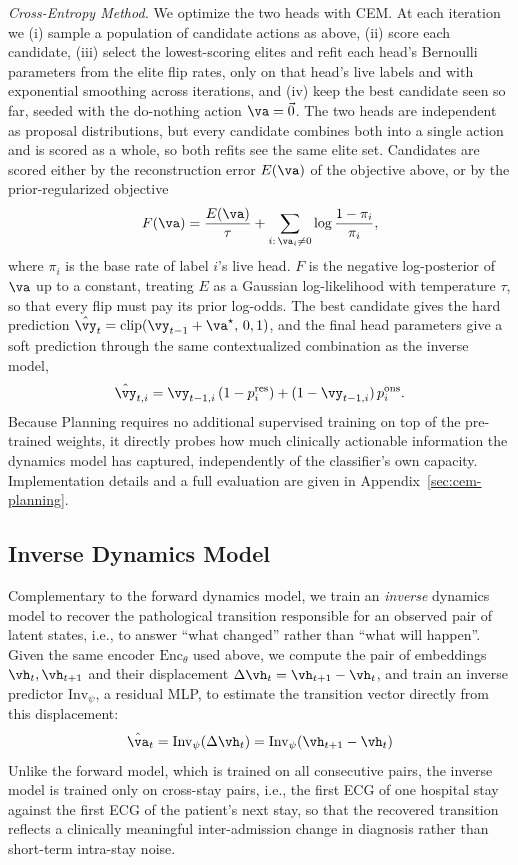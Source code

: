 \emph{Cross-Entropy Method.} We optimize the two heads with CEM. At each iteration we (i) sample a population of candidate actions as above, (ii) score each candidate, (iii) select the lowest-scoring elites and refit each head's Bernoulli parameters from the elite flip rates, only on that head's live labels and with exponential smoothing across iterations, and (iv) keep the best candidate seen so far, seeded with the do-nothing action $\va=\vec 0$. The two heads are independent as proposal distributions, but every candidate combines both into a single action and is scored as a whole, so both refits see the same elite set. Candidates are scored either by the reconstruction error $E(\va)$ of the objective above, or by the prior-regularized objective
$$ F(\va) = \frac{E(\va)}{\tau} + \sum_{i:\,\va_i\neq 0} \log\frac{1-\pi_i}{\pi_i}, $$
where $\pi_i$ is the base rate of label $i$'s live head. $F$ is the negative log-posterior of $\va$ up to a constant, treating $E$ as a Gaussian log-likelihood with temperature $\tau$, so that every flip must pay its prior log-odds. The best candidate gives the hard prediction $\hat{\vy}_t = \text{clip}(\vy_{t-1} + \va^\star,\, 0, 1)$, and the final head parameters give a soft prediction through the same contextualized combination as the inverse model,
$$ \hat{\vy}_{t,i} = \vy_{t-1,i}\,(1-p^{\text{res}}_{i}) + (1-\vy_{t-1,i})\,p^{\text{ons}}_{i}. $$
Because Planning requires no additional supervised training on top of the pre-trained weights, it directly probes how much clinically actionable information the dynamics model has captured, independently of the classifier's own capacity. Implementation details and a full evaluation are given in Appendix~\ref{sec:cem-planning}.

\subsection{Inverse Dynamics Model}
\label{sec:inverse}

Complementary to the forward dynamics model, we train an \emph{inverse} dynamics model to recover the pathological transition responsible for an observed pair of latent states, i.e., to answer ``what changed'' rather than ``what will happen''. Given the same encoder $\text{Enc}_\theta$ used above, we compute the pair of embeddings $\vh_t, \vh_{t+1}$ and their displacement $\Delta\vh_t = \vh_{t+1} - \vh_t$, and train an inverse predictor $\text{Inv}_\psi$, a residual MLP, to estimate the transition vector directly from this displacement:
$$ \hat{\va}_t = \text{Inv}_\psi(\Delta\vh_t) = \text{Inv}_\psi(\vh_{t+1} - \vh_t) $$
Unlike the forward model, which is trained on all consecutive pairs, the inverse model is trained only on cross-stay pairs, i.e., the first ECG of one hospital stay against the first ECG of the patient's next stay, so that the recovered transition reflects a clinically meaningful inter-admission change in diagnosis rather than short-term intra-stay noise.

